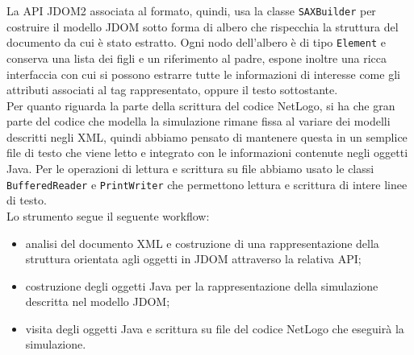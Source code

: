 La API JDOM2 associata al formato, quindi, usa la classe \texttt{SAXBuilder} \cite{sax-builder} per costruire il modello JDOM sotto forma di albero che rispecchia la struttura del documento da cui è stato estratto. Ogni nodo dell'albero è di tipo \texttt{Element} e conserva una lista dei figli e un riferimento al padre, espone inoltre una ricca interfaccia con cui si possono estrarre tutte le informazioni di interesse come gli attributi associati al tag rappresentato, oppure il testo sottostante.\\
Per quanto riguarda la parte della scrittura del codice NetLogo, si ha che gran parte del codice che modella la simulazione rimane fissa al variare dei modelli descritti negli XML, quindi abbiamo pensato di mantenere questa in un semplice file di testo che viene letto e integrato con le informazioni contenute negli oggetti Java. Per le operazioni di lettura e scrittura su file abbiamo usato le classi \texttt{BufferedReader} \cite{buffered-reader} e \texttt{PrintWriter} \cite{print-writer} che permettono lettura e scrittura di intere linee di testo.\\ 
Lo strumento segue il seguente workflow:
\begin{itemize}
\item analisi del documento XML e costruzione di una rappresentazione della struttura orientata agli oggetti in JDOM attraverso la relativa API;
\item costruzione degli oggetti Java per la rappresentazione della simulazione descritta nel modello JDOM;
\item visita degli oggetti Java e scrittura su file del codice NetLogo che eseguirà la simulazione.
\end{itemize}

